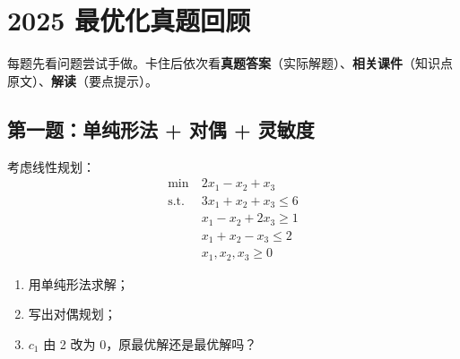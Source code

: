 
\section*{2025 最优化真题回顾}

{每题先看问题尝试手做。卡住后依次看\textbf{真题答案}（实际解题）、\textbf{相关课件}（知识点原文）、\textbf{解读}（要点提示）。}

\subsection*{第一题：单纯形法 + 对偶 + 灵敏度}

\noindent 考虑线性规划：
\[
\begin{aligned}
\min\ & 2x_1 - x_2 + x_3 \\
\text{s.t.}\ & 3x_1 + x_2 + x_3 \le 6 \\
& x_1 - x_2 + 2x_3 \ge 1 \\
& x_1 + x_2 - x_3 \le 2 \\
& x_1, x_2, x_3 \ge 0
\end{aligned}
\]
\begin{enumerate}
  \item[(1)] 用单纯形法求解；
  \item[(2)] 写出对偶规划；
  \item[(3)] $c_1$ 由 2 改为 0，原最优解还是最优解吗？
\end{enumerate}

